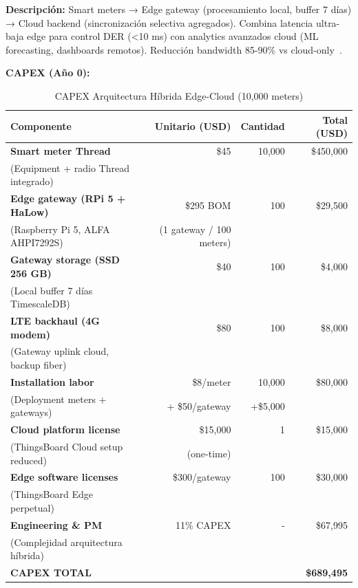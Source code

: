 \textbf{Descripción:} Smart meters → Edge gateway (procesamiento local, buffer 7 días) → Cloud backend (sincronización selectiva agregados). Combina latencia ultra-baja edge para control DER (<10 ms) con analytics avanzados cloud (ML forecasting, dashboards remotos). Reducción bandwidth 85-90\% vs cloud-only~\cite{andriuloEdgeComputingCloud2024}.

\textbf{CAPEX (Año 0):}

\begin{table}[H]
\centering
\caption{CAPEX Arquitectura Híbrida Edge-Cloud (10,000 meters)}
\label{tab:capex-hybrid}
\small
\begin{tabular}{|p{5cm}|r|r|r|}
\hline
\rowcolor{purple!20}
\textbf{Componente} & \textbf{Unitario (USD)} & \textbf{Cantidad} & \textbf{Total (USD)} \\
\hline
\textbf{Smart meter Thread} & \$45 & 10,000 & \$450,000 \\
(Equipment + radio Thread integrado) & & & \\
\hline
\textbf{Edge gateway (RPi 5 + HaLow)} & \$295 BOM & 100 & \$29,500 \\
(Raspberry Pi 5, ALFA AHPI7292S) & (1 gateway / 100 meters) & & \\
\hline
\textbf{Gateway storage (SSD 256 GB)} & \$40 & 100 & \$4,000 \\
(Local buffer 7 días TimescaleDB) & & & \\
\hline
\textbf{LTE backhaul (4G modem)} & \$80 & 100 & \$8,000 \\
(Gateway uplink cloud, backup fiber) & & & \\
\hline
\textbf{Installation labor} & \$8/meter & 10,000 & \$80,000 \\
(Deployment meters + gateways) & + \$50/gateway & +\$5,000 & \\
\hline
\textbf{Cloud platform license} & \$15,000 & 1 & \$15,000 \\
(ThingsBoard Cloud setup reduced) & (one-time) & & \\
\hline
\textbf{Edge software licenses} & \$300/gateway & 100 & \$30,000 \\
(ThingsBoard Edge perpetual) & & & \\
\hline
\textbf{Engineering \& PM} & 11\% CAPEX & - & \$67,995 \\
(Complejidad arquitectura híbrida) & & & \\
\hline
\rowcolor{gray!20}
\textbf{CAPEX TOTAL} & & & \textbf{\$689,495} \\
\hline
\end{tabular}
\end{table}

